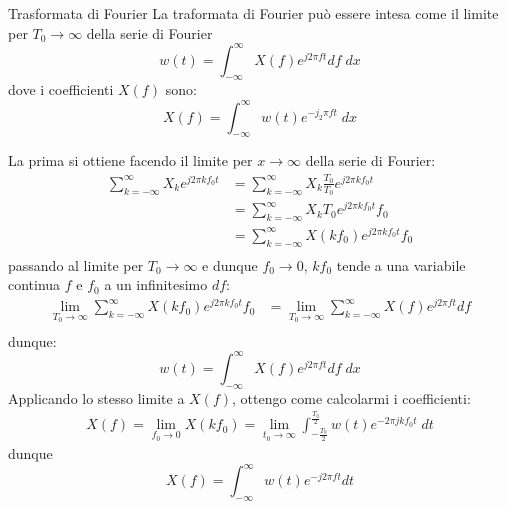 \begin{definizione}{Trasformata di Fourier}
	La traformata di Fourier può essere intesa come il limite per $ T_0 \to  \infty  $ della serie di Fourier
	\[
		w\left(t\right) = \int_{-\infty }^{\infty } X\left(f\right) e ^{ j 2 \pi  f t}df \; dx
	\]
	dove i coefficienti $ X\left(f\right) $ sono:
	\[
		X\left(f\right) = \int_{-\infty }^{\infty } w\left(t\right)e^{-j_2 \pi  ft} \; dx
	\]
\end{definizione}
La prima si ottiene facendo il limite per $ x \to  \infty  $ della serie di Fourier:
\begin{align*}
	\sum_{k = -\infty}^{\infty} X_ke^{j 2 \pi k f_0 t } & =\sum_{k = -\infty}^{\infty} X_k \frac{T_0}{T_0} e^{j 2 \pi k f_0 t }    \\
	                                                    & =\sum_{k = -\infty}^{\infty} X_k T_0 e^{j 2 \pi k f_0 t } f_0            \\
	                                                    & =\sum_{k = -\infty}^{\infty} X\left(kf_0\right) e^{j 2 \pi k f_0 t } f_0 \\
\end{align*}
passando al limite per $ T_0 \to  \infty  $ e dunque $ f_0 \to 0 $, $ kf_0 $ tende a una variabile continua $ f $ e $ f_0 $ a un infinitesimo $ df $:
\begin{align*}
	\lim_{T_0 \to \infty} \sum_{k = -\infty}^{\infty} X\left(kf_0\right) e^{j 2 \pi k f_0 t } f_0 & = \lim_{T_0 \to \infty} \sum_{k = -\infty}^{\infty} X\left(f\right) e^{j 2 \pi f t } df \\
\end{align*}
dunque:
\[
	w\left(t\right) = \int_{-\infty }^{\infty } X\left(f\right) e^{j 2 \pi f t} df \; dx
\]
Applicando lo stesso limite a $ X\left(f\right) $, ottengo come calcolarmi i coefficienti:
\begin{align*}
	X\left(f\right) = \lim_{f_0 \to 0} X\left(kf_0\right)= \lim_{t_0 \to \infty} \int_{-\frac{T_0}{2}}^{\frac{T_0}{2}} w\left(t\right)e^{-2 \pi  j k f_0 t} \; dt
\end{align*}
dunque
\[
	X\left(f\right) = \int_{-\infty }^{\infty } w\left(t\right) e^{-j 2 \pi f t} dt
\]
